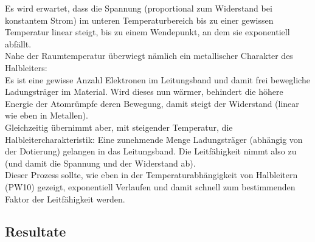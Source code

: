 \documentclass[12pt,a4paper]{article}
\begin{document}
\begin{multicols}{2}
Es wird erwartet, dass die Spannung (proportional zum Widerstand bei konstantem Strom) im unteren Temperaturbereich bis zu einer gewissen Temperatur linear steigt, bis zu einem Wendepunkt, an dem sie exponentiell abfällt.\\
Nahe der Raumtemperatur überwiegt nämlich ein metallischer Charakter des Halbleiters:\\
Es ist eine gewisse Anzahl Elektronen im  Leitungsband und damit frei bewegliche Ladungsträger im Material. Wird dieses nun wärmer, behindert die höhere Energie der Atomrümpfe deren Bewegung, damit steigt der Widerstand (linear wie eben in Metallen).\\
Gleichzeitig übernimmt aber, mit steigender Temperatur, die Halbleitercharakteristik: Eine zunehmende Menge Ladungsträger (abhängig von der Dotierung) gelangen in das Leitungsband. Die Leitfähigkeit nimmt also zu (und damit die Spannung und der Widerstand ab).\\
Dieser Prozess sollte, wie eben in der Temperaturabhängigkeit von Halbleitern (PW10) gezeigt, exponentiell Verlaufen und damit schnell zum bestimmenden Faktor der Leitfähigkeit werden.



\end{multicols}

\subsection{Resultate}
\end{document}
